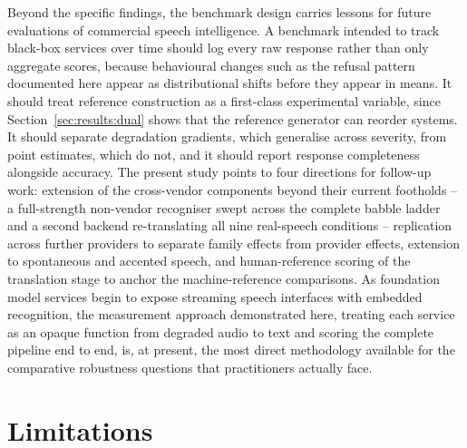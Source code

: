 Beyond the specific findings, the benchmark design carries lessons for
future evaluations of commercial speech intelligence. A benchmark intended
to track black-box services over time should log every raw response rather
than only aggregate scores, because behavioural changes such as the refusal
pattern documented here appear as distributional shifts before they appear
in means. It should treat reference construction as a first-class
experimental variable, since Section~\ref{sec:results:dual} shows that the
reference generator can reorder systems. It should separate degradation
gradients, which generalise across severity, from point estimates, which do
not, and it should report response completeness alongside accuracy. The
present study points to four directions for follow-up work: extension of
the cross-vendor components beyond their current footholds -- a
full-strength non-vendor recogniser swept across the complete babble
ladder and a second backend re-translating all nine real-speech
conditions -- replication
across further providers to separate family effects from provider effects,
extension to spontaneous and accented speech, and human-reference scoring
of the translation stage to anchor the machine-reference comparisons. As foundation
model services begin to expose streaming speech interfaces with embedded
recognition, the measurement approach demonstrated here, treating each
service as an opaque function from degraded audio to text and scoring the
complete pipeline end to end, is, at present, the most direct methodology available for
the comparative robustness questions that practitioners actually face.

\section{Limitations}
\label{sec:limitations}

